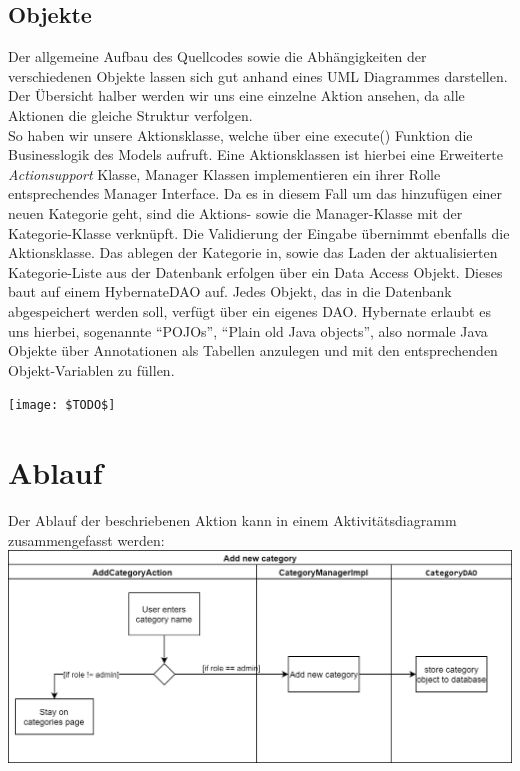 \documentclass[12pt,a4paper]{article}
\begin{document}
	\subsection{Objekte}
	Der allgemeine Aufbau des Quellcodes sowie die Abhängigkeiten der verschiedenen Objekte lassen sich gut anhand eines UML Diagrammes darstellen. Der Übersicht halber werden wir uns eine einzelne Aktion ansehen, da alle Aktionen die gleiche Struktur verfolgen.\\
	So haben wir unsere Aktionsklasse, welche über eine execute() Funktion die Businesslogik des Models aufruft. Eine Aktionsklassen ist hierbei eine Erweiterte \textit{Actionsupport} Klasse, Manager Klassen implementieren ein ihrer Rolle entsprechendes Manager Interface. Da es in diesem Fall um das hinzufügen einer neuen Kategorie geht, sind die Aktions- sowie die Manager-Klasse mit der Kategorie-Klasse verknüpft. Die Validierung der Eingabe übernimmt ebenfalls die Aktionsklasse.
	Das ablegen der Kategorie in, sowie das Laden der aktualisierten Kategorie-Liste aus der Datenbank erfolgen über ein Data Access Objekt. Dieses baut auf einem HybernateDAO auf. Jedes Objekt, das in die Datenbank abgespeichert werden soll, verfügt über ein eigenes DAO. Hybernate erlaubt es uns hierbei, sogenannte "`POJOs"', "`Plain old Java objects"', also normale Java Objekte über Annotationen als Tabellen anzulegen und mit den entsprechenden Objekt-Variablen zu füllen.
	\begin{center}
		\texttt{[image: \$TODO\$]}
	\end{center}

	
	\section{Ablauf}
	Der Ablauf der beschriebenen Aktion kann in einem Aktivitätsdiagramm zusammengefasst werden:
	\centering \includegraphics[scale=0.3]{diagrams/addnewcategory.png}
\end{document}
